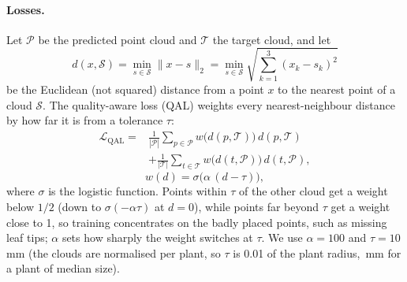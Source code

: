 \documentclass[10pt,twocolumn,letterpaper]{article}
\begin{document}
\paragraph{Losses.}
Let $\mathcal{P}$ be the predicted point cloud and $\mathcal{T}$ the target cloud, and let
\begin{equation}
  d(x,\mathcal{S})=\min_{s\in\mathcal{S}}\lVert x-s\rVert_2
  =\min_{s\in\mathcal{S}}\sqrt{\textstyle\sum_{k=1}^{3}(x_k-s_k)^2}
  \label{eq:dist}
\end{equation}
be the Euclidean (not squared) distance from a point $x$ to the nearest point of a cloud $\mathcal{S}$. The
quality-aware loss (QAL) weights every nearest-neighbour distance by how far it is from a tolerance $\tau$:
\begin{equation}
  \begin{aligned}
    \mathcal{L}_{\mathrm{QAL}} ={}& \frac{1}{|\mathcal{P}|}\sum_{p\in\mathcal{P}} w\big(d(p,\mathcal{T})\big)\,d(p,\mathcal{T})\\
      &+ \frac{1}{|\mathcal{T}|}\sum_{t\in\mathcal{T}} w\big(d(t,\mathcal{P})\big)\,d(t,\mathcal{P}),
  \end{aligned}
  \label{eq:qal}
\end{equation}
\begin{equation}
  w(d) = \sigma\big(\alpha\,(d-\tau)\big),
  \label{eq:qal_w}
\end{equation}
where $\sigma$ is the logistic function. Points within $\tau$ of the other cloud get a weight below $1/2$
(down to $\sigma(-\alpha\tau)$ at $d=0$), while points far beyond $\tau$ get a weight close to 1, so training
concentrates on the badly placed points, such as missing leaf tips; $\alpha$ sets how sharply the weight switches
at $\tau$. We use
$\alpha=100$ and $\tau=10$\,mm (the clouds are normalised per plant, so $\tau$ is 0.01 of the plant radius, \,mm for a plant of median size).
\end{document}

